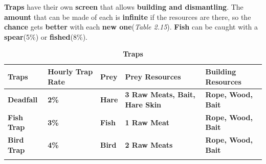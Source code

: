 		\par \textbf{Traps} have their own \textbf{screen} that allows \textbf{building and dismantling}. The \textbf{amount} that can be made of each is  \textbf{infinite} if the resources are there, so the  \textbf{chance} gets \textbf{better} with each  \textbf{new one}(\textit{Table 2.15}). \textbf{Fish} can be caught with a \textbf{spear}(5\%) or \textbf{fished}(8\%).
			\begin{longtable}{|C{6em}|C{6em}|C{5em}|C{9em}|C{9em}|}
			   \toprule
			    \textcolor[rgb]{ 1,  1,  1}{\textbf{Traps}} & \textcolor[rgb]{ 1,  1,  1}{\textbf{Hourly Trap Rate}} & \textcolor[rgb]{ 1,  1,  1}{\textbf{Prey}} & \textcolor[rgb]{ 1,  1,  1}{\textbf{Prey Resources}} & \textcolor[rgb]{ 1,  1,  1}{\textbf{Building Resources}} \\
			    \midrule
			     \textbf{Deadfall} & \textbf{2\%} & \textbf{Hare} & \textbf{3 Raw Meats, Bait, Hare Skin} & \textbf{Rope, Wood, Bait} \\
			    \midrule
			     \textbf{Fish Trap} & \textbf{3\%} & \textbf{Fish} & \textbf{1 Raw Meat} & \textbf{Rope, Wood, Bait} \\
			    \midrule
			     \textbf{Bird Trap} & \textbf{4\%} & \textbf{Bird} & \textbf{2 Raw Meats} & \textbf{Rope, Wood, Bait} \\
			    \bottomrule
			\caption{\textbf{Traps} }	
			\end{longtable}

